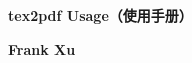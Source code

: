 \begin{titlepage}
  \begin{center}
  \thispagestyle{empty}

  \vspace*{0.5cm}

  \Huge
	  \textbf{tex2pdf Usage（使用手册）}

  \vspace{0.5cm}
  \vfill

  \Large
  \textbf{Frank Xu}

  \end{center}
  \clearpage

\end{titlepage}
